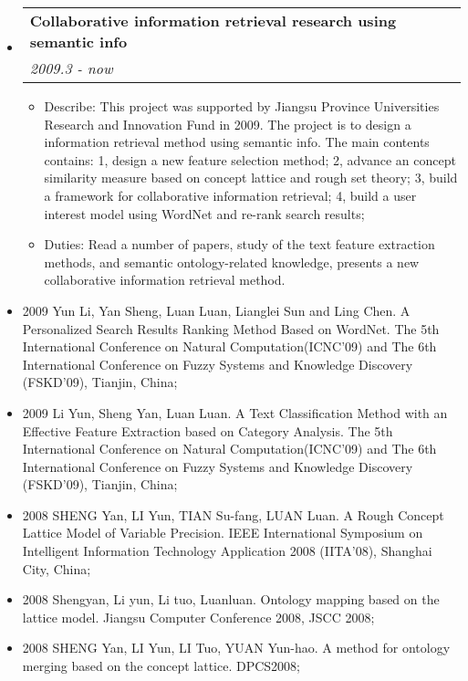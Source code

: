 \documentclass[letterpaper,11pt]{article}
\makeatletter
\newcommand{\resitem}[1]{\item #1 \vspace{-2pt}}
\newcommand{\resheading}[1]{{\large \parashade[.9]{sharpcorners}{\textbf{#1 \vphantom{p\^{E}}}}}}
\newcommand{\ressubheading}[4]{
\begin{tabular*}{6.5in}{l@{\extracolsep{\fill}}r}
        \textbf{#1} & #2 \\
        \textit{#3} & \textit{#4} \\
\end{tabular*}\vspace{-6pt}}
\makeatother
\begin{document}
\begin{CJK*}{GBK}{kai}
\begin{itemize}
\item
    \ressubheading{Collaborative information retrieval research using semantic info}{}{2009.3 - now}{}
    \begin{itemize}
        \resitem{   Describe: This project was supported by Jiangsu Province Universities Research and Innovation Fund in 2009. The project is to design a information retrieval method using semantic info. The main contents contains: 1, design a new feature selection method; 2, advance an concept similarity measure based on concept lattice and rough set theory; 3, build a framework for collaborative information retrieval; 4, build a user interest model using WordNet and re-rank search results;}
        \resitem{   Duties: Read a number of papers, study of the text feature extraction methods, and semantic ontology-related knowledge, presents a new collaborative information retrieval method.}
    \end{itemize}
\end{itemize}

\resheading{Papers}
\begin{itemize}
\item{2009 }
Yun Li, Yan Sheng, Luan Luan, Lianglei Sun and Ling Chen. A
Personalized Search Results Ranking Method Based on WordNet. The 5th
International Conference on Natural Computation(ICNC'09) and The 6th
International Conference on Fuzzy Systems and  Knowledge Discovery
(FSKD'09), Tianjin, China;

\item{2009 }
Li Yun, Sheng Yan, Luan Luan. A Text Classification Method with an
Effective Feature Extraction based on Category Analysis. The 5th
International Conference on Natural Computation(ICNC'09) and The 6th
International Conference on Fuzzy Systems and Knowledge Discovery
(FSKD'09), Tianjin, China;

\item{2008 }
SHENG Yan, LI Yun, TIAN Su-fang, LUAN Luan. A Rough Concept Lattice
Model of Variable Precision. IEEE International Symposium on
Intelligent Information Technology Application 2008 (IITA'08),
Shanghai City, China;

\item{2008 }
Shengyan, Li yun, Li tuo, Luanluan. Ontology mapping based on the lattice model. Jiangsu Computer Conference 2008, JSCC 2008;

\item{2008 }
SHENG Yan, LI Yun, LI Tuo, YUAN Yun-hao. A method for ontology merging based on the concept lattice. DPCS2008;


\end{itemize}
\end{CJK*}
\end{document}
